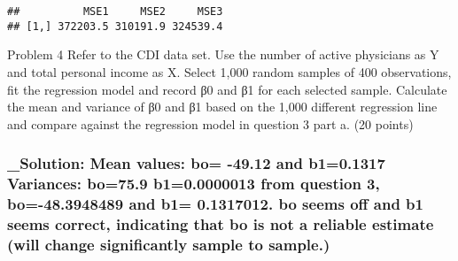 \documentclass[
]{article}
\newenvironment{Shaded}{\begin{snugshade}}{\end{snugshade}}
\newcommand{\ControlFlowTok}[1]{\textcolor[rgb]{0.13,0.29,0.53}{\textbf{#1}}}
\newcommand{\DataTypeTok}[1]{\textcolor[rgb]{0.13,0.29,0.53}{#1}}
\newcommand{\DecValTok}[1]{\textcolor[rgb]{0.00,0.00,0.81}{#1}}
\newcommand{\KeywordTok}[1]{\textcolor[rgb]{0.13,0.29,0.53}{\textbf{#1}}}
\newcommand{\NormalTok}[1]{#1}
\newcommand{\OperatorTok}[1]{\textcolor[rgb]{0.81,0.36,0.00}{\textbf{#1}}}
\newcommand{\StringTok}[1]{\textcolor[rgb]{0.31,0.60,0.02}{#1}}
\begin{document}
\begin{verbatim}
##          MSE1     MSE2     MSE3
## [1,] 372203.5 310191.9 324539.4
\end{verbatim}

Problem 4 Refer to the CDI data set. Use the number of active physicians
as Y and total personal income as X. Select 1,000 random samples of 400
observations, fit the regression model and record β0 and β1 for each
selected sample. Calculate the mean and variance of β0 and β1 based on
the 1,000 different regression line and compare against the regression
model in question 3 part a. (20 points)

\hypertarget{solution-mean-values-bo--49.12-and-b10.1317-variances-bo75.9-b10.0000013-from-question-3-bo-48.3948489-and-b1-0.1317012.-bo-seems-off-and-b1-seems-correct-indicating-that-bo-is-not-a-reliable-estimate-will-change-significantly-sample-to-sample.}{%
\subsubsection{\_Solution: Mean values: bo= -49.12 and b1=0.1317
Variances: bo=75.9 b1=0.0000013 from question 3, bo=-48.3948489 and b1=
0.1317012. bo seems off and b1 seems correct, indicating that bo is not
a reliable estimate (will change significantly sample to
sample.)}\label{solution-mean-values-bo--49.12-and-b10.1317-variances-bo75.9-b10.0000013-from-question-3-bo-48.3948489-and-b1-0.1317012.-bo-seems-off-and-b1-seems-correct-indicating-that-bo-is-not-a-reliable-estimate-will-change-significantly-sample-to-sample.}}

\begin{Shaded}
\end{Shaded}
\end{document}
